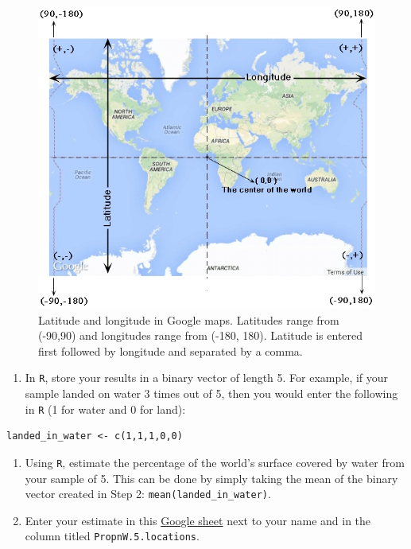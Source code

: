 \documentclass[letterpaper,12pt,twoside,]{pinp}
\providecommand{\tightlist}{%
  \setlength{\itemsep}{0pt}\setlength{\parskip}{0pt}}
\begin{document}
\begin{figure}[H]
  \begin{center}
    \includegraphics[scale=0.40]{lat-long.png} 
  \end{center}
  \caption{Latitude and longitude in Google maps. Latitudes range from (-90,90) and longitudes range from (-180, 180). Latitude is entered first followed by longitude and separated by a comma.}\label{maps}
\end{figure}

\begin{enumerate}
\def\labelenumi{\arabic{enumi}.}
\setcounter{enumi}{1}
\tightlist
\item
  In \texttt{R}, store your results in a binary vector of length 5. For
  example, if your sample landed on water 3 times out of 5, then you
  would enter the following in \texttt{R} (1 for water and 0 for land):
\end{enumerate}

\begin{ShadedResult}
\begin{verbatim}
landed_in_water <- c(1,1,1,0,0)
\end{verbatim}
\end{ShadedResult}

\begin{enumerate}
\def\labelenumi{\arabic{enumi}.}
\setcounter{enumi}{2}
\item
  Using \texttt{R}, estimate the percentage of the world's surface
  covered by water from your sample of 5. This can be done by simply
  taking the mean of the binary vector created in Step 2:
  \texttt{mean(landed\_in\_water)}.
\item
  Enter your estimate in this
  \href{https://docs.google.com/spreadsheets/d/1Mnxeq9nQcTdQycZ7S_62fYFiNC5_a3fibsyodzfwO58/edit?usp=sharing}{Google
  sheet} next to your name and in the column titled
  \texttt{PropnW.5.locations}.
\end{enumerate}
\end{document}

